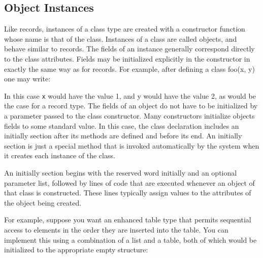 \subsection{Object Instances}
Like records, instances of a class type
are created with a constructor function whose
name is that of the class. Instances of a class are called objects, and
behave similar to records. The fields of an instance generally
correspond directly to the class attributes. Fields may be initialized
explicitly in the constructor in exactly the same way as for records.
For example, after defining a \textsf{class foo(x, y)} one may write: 


In this case \texttt{x} would have the value \textsf{1}, and \textsf{y}
would have the value \textsf{2}, as would be the case for a record
type. The fields of an object do not have to be initialized by a
parameter passed to the class constructor. Many constructors initialize
objects{\textquotesingle} fields to some standard value. In this case,
the class declaration includes an \textsf{initially}
section after its methods are defined and before its end. An
\textsf{initially} section is just a special method that is invoked
automatically by the system when it creates each instance of the class.

An \textsf{initially} section begins with the reserved word
\textsf{initially} and an optional parameter list, followed by lines of
code that are executed whenever an object of that class is constructed.
These lines typically assign values to the attributes of the object
being created.

For example, suppose you want an enhanced table type that permits
sequential access to elements in the order they are inserted into the
table. You can implement this using a combination of a list and a
table, both of which would be initialized to the appropriate empty
structure: 


